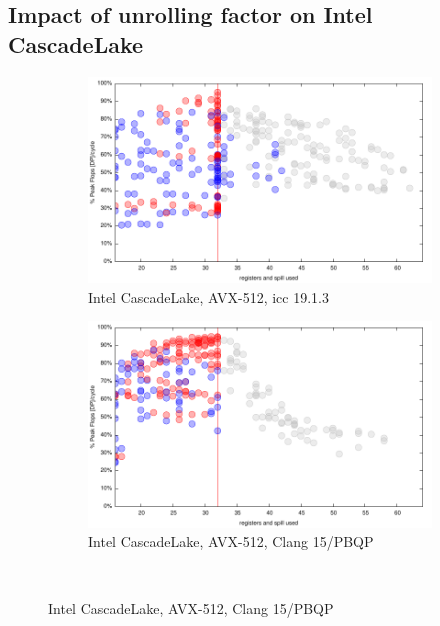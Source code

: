 \documentclass{article}
\begin{document}
\subsection{Impact of unrolling factor on Intel CascadeLake}
\begin{figure}[h!]
  \begin{subfigure}[h!]{0.45\textwidth}  
\includegraphics[width=\textwidth]{../benches/gemm/cascadelake-64x256x64/icc-19.1.3.pdf}
  \caption{Intel CascadeLake, AVX-512, icc 19.1.3}
  \end{subfigure}
  \begin{subfigure}[h!]{0.45\textwidth}  
\includegraphics[width=\textwidth]{../benches/gemm/cascadelake-64x256x64/pbqp.pdf}
  \caption{Intel CascadeLake, AVX-512, Clang 15/PBQP}
  \end{subfigure}\\

\end{figure}
\end{document}
